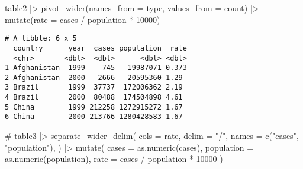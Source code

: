 \documentclass[
  letterpaper,
  DIV=11,
  numbers=noendperiod]{scrreprt}
\newenvironment{Shaded}{\begin{snugshade}}{\end{snugshade}}
\newcommand{\AttributeTok}[1]{\textcolor[rgb]{0.40,0.45,0.13}{#1}}
\newcommand{\CommentTok}[1]{\textcolor[rgb]{0.37,0.37,0.37}{#1}}
\newcommand{\DecValTok}[1]{\textcolor[rgb]{0.68,0.00,0.00}{#1}}
\newcommand{\FunctionTok}[1]{\textcolor[rgb]{0.28,0.35,0.67}{#1}}
\newcommand{\NormalTok}[1]{\textcolor[rgb]{0.00,0.23,0.31}{#1}}
\newcommand{\SpecialCharTok}[1]{\textcolor[rgb]{0.37,0.37,0.37}{#1}}
\newcommand{\StringTok}[1]{\textcolor[rgb]{0.13,0.47,0.30}{#1}}
\begin{document}
\begin{enumerate}
  \begin{tcolorbox}[enhanced jigsaw, breakable, bottomtitle=1mm, left=2mm, colback=white, toprule=.15mm, leftrule=.75mm, colframe=quarto-callout-note-color-frame, colbacktitle=quarto-callout-note-color!10!white, title={Answer}, coltitle=black, toptitle=1mm, bottomrule=.15mm, opacitybacktitle=0.6, arc=.35mm, rightrule=.15mm, titlerule=0mm, opacityback=0]

\begin{Shaded}
\begin{Highlighting}[]
\NormalTok{table2 }\SpecialCharTok{|\textgreater{}}
  \FunctionTok{pivot\_wider}\NormalTok{(}\AttributeTok{names\_from =}\NormalTok{ type,}
              \AttributeTok{values\_from =}\NormalTok{ count) }\SpecialCharTok{|\textgreater{}}
  \FunctionTok{mutate}\NormalTok{(}\AttributeTok{rate =}\NormalTok{ cases }\SpecialCharTok{/}\NormalTok{ population }\SpecialCharTok{*} \DecValTok{10000}\NormalTok{)}
\end{Highlighting}
\end{Shaded}

\begin{verbatim}
# A tibble: 6 x 5
  country      year  cases population  rate
  <chr>       <dbl>  <dbl>      <dbl> <dbl>
1 Afghanistan  1999    745   19987071 0.373
2 Afghanistan  2000   2666   20595360 1.29 
3 Brazil       1999  37737  172006362 2.19 
4 Brazil       2000  80488  174504898 4.61 
5 China        1999 212258 1272915272 1.67 
6 China        2000 213766 1280428583 1.67 
\end{verbatim}

\begin{Shaded}
\begin{Highlighting}[]
\CommentTok{\#}
\NormalTok{table3 }\SpecialCharTok{|\textgreater{}}
  \FunctionTok{separate\_wider\_delim}\NormalTok{(}
    \AttributeTok{cols =}\NormalTok{ rate,}
    \AttributeTok{delim =} \StringTok{"/"}\NormalTok{,}
    \AttributeTok{names =} \FunctionTok{c}\NormalTok{(}\StringTok{"cases"}\NormalTok{, }\StringTok{"population"}\NormalTok{),}
\NormalTok{  ) }\SpecialCharTok{|\textgreater{}}
  \FunctionTok{mutate}\NormalTok{(}
    \AttributeTok{cases =} \FunctionTok{as.numeric}\NormalTok{(cases),}
    \AttributeTok{population =} \FunctionTok{as.numeric}\NormalTok{(population),}
    \AttributeTok{rate =}\NormalTok{ cases }\SpecialCharTok{/}\NormalTok{ population }\SpecialCharTok{*} \DecValTok{10000}
\NormalTok{  )}
\end{Highlighting}
\end{Shaded}


\end{tcolorbox}
\end{enumerate}
\end{document}
